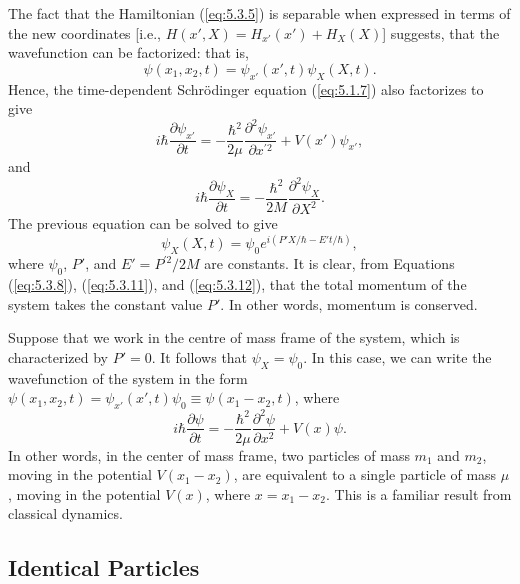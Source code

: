 The fact that the Hamiltonian (\ref{eq:5.3.5}) is separable when expressed in terms of the new coordinates [i.e., $H(x', X) = H_{x'}(x') + H_{X}(X)$] suggests, that the wavefunction can be factorized: that is,
\begin{equation}
	\psi(x_1, x_2, t) = \psi_{x'}(x', t)\psi_X(X, t).
	\label{eq:5.3.9}
\end{equation}
Hence, the time-dependent Schrödinger equation (\ref{eq:5.1.7}) also factorizes to give
\begin{equation}
	i\hbar\frac{\partial\psi_{x'}}{\partial t} = -\frac{\hbar^{2}}{2\mu}\frac{\partial^{2}\psi_{x'}}{\partial x^{\prime 2}} + V(x')\psi_{x'},
	\label{eq:5.3.10}
\end{equation}
and
\begin{equation}
	i\hbar\frac{\partial\psi_{X}}{\partial t} = -\frac{\hbar^{2}}{2 M}\frac{\partial^{2}\psi_{X}}{\partial X^{2}}.
	\label{eq:5.3.11}
\end{equation}
The previous equation can be solved to give
\begin{equation}
	\psi_{X}(X, t) = \psi_{0} e^{i(P' X/\hbar - E' t/\hbar)},
	\label{eq:5.3.12}
\end{equation}
where $\psi_{0}$, $P'$, and $E' = P^{\prime 2}/ 2 M$ are constants. It is clear, from Equations (\ref{eq:5.3.8}), (\ref{eq:5.3.11}), and (\ref{eq:5.3.12}), that the total momentum of the system takes the constant value $P'$. In other words, momentum is conserved.

Suppose that we work in the centre of mass frame of the system, which is characterized by $P' = 0$. It follows that $\psi_{X} = \psi_{0}$. In this case, we can write the wavefunction of the system in the form $\psi(x_{1}, x_{2}, t) = \psi_{x'}(x', t)\psi_{0} \equiv \psi(x_{1}-x_{2}, t)$, where
\begin{equation}
	i\hbar\frac{\partial\psi}{\partial t} = -\frac{\hbar^{2}}{2\mu}\frac{\partial^{2}\psi}{\partial x^{2}} + V(x)\psi.
	\label{eq:5.3.13}
\end{equation}
In other words, in the center of mass frame, two particles of mass $m_{1}$ and $m_{2}$, moving in the potential $V(x_{1}-x_{2})$, are equivalent to a single particle of mass $\mu$, moving in the potential $V(x)$, where $x = x_{1}-x_{2}$. This is a familiar result from classical dynamics.

\subsection{Identical Particles}
\label{sec:5.4}

